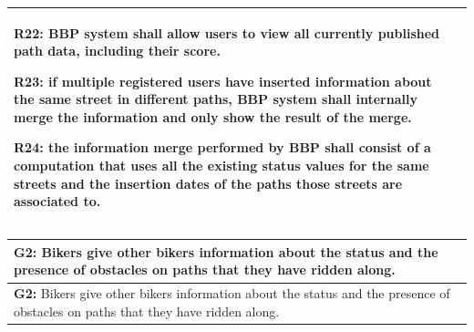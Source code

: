 \documentclass{article}
\begin{document}
\begin{longtable}{|p{}|p{}|}
    R22: BBP system shall allow users to view all currently published path data, including their score. \par
    R23: if multiple registered users have inserted information about the same street in different paths, BBP system shall internally merge the information and only show the result of the merge. \par
    R24: the information merge performed by BBP shall consist of a computation that uses all the existing status values for the same streets and the insertion dates of the paths those streets are associated to.
    & \par
    \\
    \hline
\end{longtable}

\newpage
\begin{longtable}{|p{}|p{}|}
    \hline
    \multicolumn{2}{|p{\dimexpr\textwidth-2\tabcolsep-2\arrayrulewidth}|}{
        \textbf{G2:} Bikers give other bikers information about the status and the presence of obstacles on paths that they have ridden along.
    } \\
    \hline
    \endfirsthead
    \hline
    \multicolumn{2}{|p{\dimexpr\textwidth-2\tabcolsep-2\arrayrulewidth}|}{
        \textbf{G2:} Bikers give other bikers information about the status and the presence of obstacles on paths that they have ridden along.
    } \\
    \hline
    \endhead
 

\end{longtable}
\end{document}
